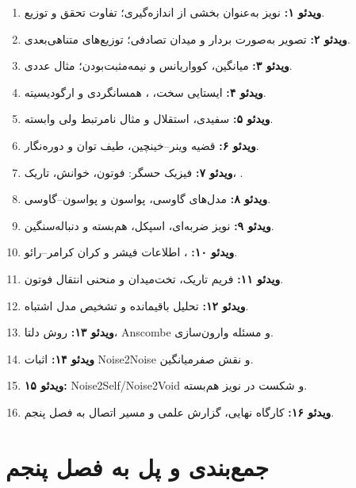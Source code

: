 \documentclass[12pt,openany,oneside]{book}
\begin{document}
\begin{videobox}
\begin{enumerate}
\item \textbf{ویدئو ۱:} نویز به‌عنوان بخشی از اندازه‌گیری؛ تفاوت تحقق و توزیع.
\item \textbf{ویدئو ۲:} تصویر به‌صورت بردار و میدان تصادفی؛ توزیع‌های متناهی‌بعدی.
\item \textbf{ویدئو ۳:} میانگین، کوواریانس و نیمه‌مثبت‌بودن؛ مثال عددی.
\item \textbf{ویدئو ۴:} ایستایی سخت، ، همسانگردی و ارگودیسیته.
\item \textbf{ویدئو ۵:} سفیدی، استقلال و مثال نامرتبط ولی وابسته.
\item \textbf{ویدئو ۶:} قضیه وینر--خینچین، طیف توان و دوره‌نگار.
\item \textbf{ویدئو ۷:} فیزیک حسگر: فوتون، خوانش، تاریک، .
\item \textbf{ویدئو ۸:} مدل‌های گاوسی، پواسون و پواسون--گاوسی.
\item \textbf{ویدئو ۹:} نویز ضربه‌ای، اسپکل، هم‌بسته و دنباله‌سنگین.
\item \textbf{ویدئو ۱۰:} ، اطلاعات فیشر و کران کرامر--رائو.
\item \textbf{ویدئو ۱۱:} فریم تاریک، تخت‌میدان و منحنی انتقال فوتون.
\item \textbf{ویدئو ۱۲:} تحلیل باقیمانده و تشخیص مدل اشتباه.
\item \textbf{ویدئو ۱۳:} روش دلتا، Anscombe و مسئله وارون‌سازی.
\item \textbf{ویدئو ۱۴:} اثبات Noise2Noise و نقش صفرمیانگین.
\item \textbf{ویدئو ۱۵:} Noise2Self/Noise2Void و شکست در نویز هم‌بسته.
\item \textbf{ویدئو ۱۶:} کارگاه نهایی، گزارش علمی و مسیر اتصال به فصل پنجم.
\end{enumerate}
\end{videobox}

\section{جمع‌بندی و پل به فصل پنجم}
\end{document}
